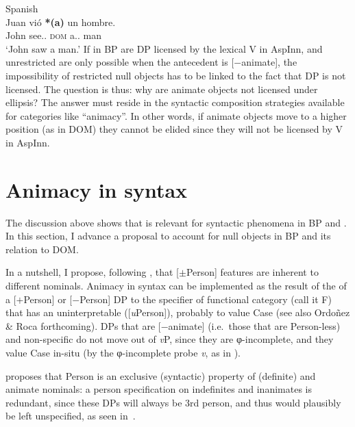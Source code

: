 \documentclass[output=paper]{langsci/langscibook}
\begin{document}
\ea\label{ex:key:27.25} Spanish\\
    \gll Juan    vió \textbf{*(a)} un hombre.\\
        John    see.\Pst.\Tsg{}  \hphantom{\textbf{*(}}\textsc{dom} a.\M.\Sg{}    man\\
    \glt `John saw a man.'
\z
If  in \gls{BP} are DP  licensed
by the lexical V in AspInn, and unrestricted  are only possible
when the antecedent is [$-$animate], the impossibility of restricted null
objects has to be linked to the fact that DP  is not licensed. The
question is thus: why are animate objects not licensed under ellipsis? The
answer must reside in the syntactic composition strategies available for
categories like \enquote{animacy}. In other words, if animate objects move to a
higher position (as in DOM) they cannot be
elided since they will not be licensed by V in AspInn.

\section{Animacy in syntax}\label{sec:key:27.3}

The discussion above shows that  is relevant for syntactic phenomena in
BP and . In this section, I advance a proposal to account for null
objects in \gls{BP} and its relation to DOM\@.

In a nutshell, I propose, following \citet{Richards2008}, that [$\pm$Person]
features are inherent to different nominals. Animacy in syntax can be
implemented as the result of the  of a [$+$Person] or [$-$Person] DP to
the specifier of functional category (call it F\tss{[Person]}) that has an
uninterpretable ([\emph{u}Person]), probably to value Case (see also Ordoñez
\& Roca forthcoming). DPs that are [$-$animate] (i.e.\ those that are
Person-less) and non-specific do not move out of \emph{v}P, since they are
φ-incomplete, and they value Case in-situ (by the φ-incomplete probe \emph{v},
as in \citealt{Rodriguez-Mondonedo2007}).

\citet[140]{Richards2008} proposes that Person is an exclusive (syntactic)
property of (definite) and animate nominals: a person
specification on indefinites and inanimates is redundant, since these DPs will
always be 3rd person, and thus would plausibly be left
unspecified, as seen in~.
\end{document}
